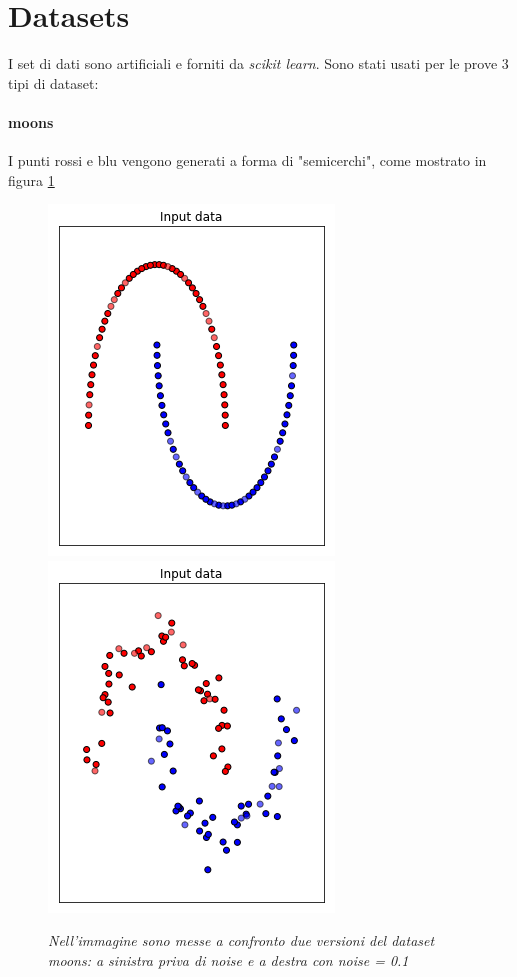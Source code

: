 \documentclass[12pt,a4paper]{report}
\begin{document}
\section{Datasets}

I set di dati sono artificiali e forniti da \textit{scikit learn}. 
Sono stati usati per le prove 3 tipi di dataset:

\paragraph{moons} I punti rossi e blu vengono generati a forma di "semicerchi", come mostrato in figura \ref{moons} 

\begin{figure}[H]
 \centering
 \includegraphics[scale = 0.5]{images/moons_nonoise}
 \includegraphics[scale = 0.5]{images/moons_noise}
 \caption{\textit{Nell'immagine sono messe a confronto due versioni del dataset moons: a sinistra priva di noise e a destra con noise = 0.1}}
 \label{moons}
\end{figure}
\end{document}
